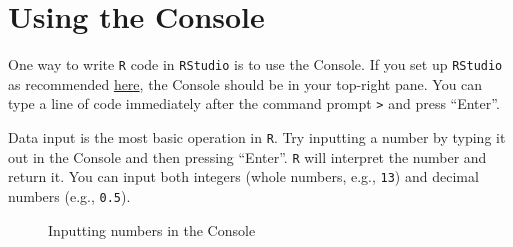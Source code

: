 \documentclass[
  letterpaper,
  DIV=11,
  numbers=noendperiod,
  oneside]{scrreprt}
\begin{document}
\section{Using the Console}\label{using-the-console}

{}

One way to write \texttt{R} code in \texttt{RStudio} is to use the
Console. If you set up \texttt{RStudio} as recommended
\href{https://elenlefoll.github.io/RstatsTextbook/InstallingR.html\#global-options}{here},
the Console should be in your top-right pane. You can type a line of
code immediately after the command prompt \texttt{\textgreater{}} and
press ``Enter''.

Data input is the most basic operation in \texttt{R}. Try inputting a
number by typing it out in the Console and then pressing ``Enter''.
\texttt{R} will interpret the number and return it. You can input both
integers (whole numbers, e.g., \texttt{13}) and decimal numbers (e.g.,
\texttt{0.5}).

\begin{figure}


\caption{\label{fig-ConsoleInputNumbers}Inputting numbers in the
Console}

\end{figure}%
\end{document}
